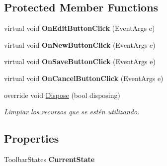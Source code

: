 \subsection*{Protected Member Functions}
\begin{DoxyCompactItemize}
\item 
\mbox{\label{class_custom_controls_1_1_stack_view_a19b739e8edd30f174bfe870081ecfed3}} 
virtual void {\bfseries On\+Edit\+Button\+Click} (Event\+Args e)
\item 
\mbox{\label{class_custom_controls_1_1_stack_view_a11ce82dee60bdffc83f7d3ebdf10b17a}} 
virtual void {\bfseries On\+New\+Button\+Click} (Event\+Args e)
\item 
\mbox{\label{class_custom_controls_1_1_stack_view_a77a46c2d55bf40ed18bcfe90dcaf3805}} 
virtual void {\bfseries On\+Save\+Button\+Click} (Event\+Args e)
\item 
\mbox{\label{class_custom_controls_1_1_stack_view_a48997386c95398640506e1e5ada5f0dd}} 
virtual void {\bfseries On\+Cancel\+Button\+Click} (Event\+Args e)
\item 
override void \hyperlink{class_custom_controls_1_1_stack_view_a227a09aebaaa2cc577a4bfa50cb08967}{Dispose} (bool disposing)
\begin{DoxyCompactList}\small\item\em Limpiar los recursos que se estén utilizando. \end{DoxyCompactList}\end{DoxyCompactItemize}
\subsection*{Properties}
\begin{DoxyCompactItemize}
\item 
\mbox{\label{class_custom_controls_1_1_stack_view_a71200adab4464290b2df815e233b5bf9}} 
Toolbar\+States {\bfseries Current\+State}
\end{DoxyCompactItemize}
